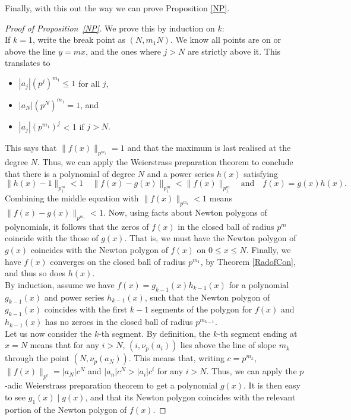 Finally, with this out the way we can prove Proposition \ref{NP}.

\begin{proof}[Proof of Proposition~\ref{NP}]
    We prove this by induction on $k$:\\
    If $k=1$, write the break point as $(N, m_1N)$. We know all points are on or above the line
    $y = m x$, and the ones where $j > N$ are strictly above it. This translates to
    \begin{itemize}
        \item $|a_j | (p^j)^{m_1} \leq 1$ for all $j$,
        \item $|a_N | (p^N)^{m_1} = 1$, and
        \item $|a_j | (p^{m_1})^j$ < 1 if $j > N.$
    \end{itemize}
    This says that $\|f(x) \|_{p^{m_1}} = 1$ and that the maximum is last realised at the degree
    $N$. Thus, we can apply the Weierstrass preparation theorem to conclude that there is a
    polynomial of degree $N$ and a power series $h(x)$ satisfying
    \[
    \| h(x) - 1 \|_{p^m_1} < 1 \quad \|f(x) - g(x)\|_{p^m_1} < \|f(x) \|_{p^m_1} \quad \text{and} \quad f(x) = g(x) h(x).
    \]
    Combining the middle equation with $\| f(x) \|_{p^{m_1}} < 1$ means
    $\| f(x) - g(x) \|_{p^{m_1}} < 1$.
    Now, using facts about Newton polygons of polynomials, it follows that the zeros of $f(x)$ in
    the closed ball of radius $p^m$ coincide with the those of $g(x)$. That is, we must have the
    Newton polygon of $g(x)$ coincides with the Newton polygon of $f(x)$ on $0 \leq x \leq N$.
    Finally, we have $f(x)$ converges on the closed ball of radius $p^{m_1}$, by Theorem
    \ref{RadofCon}, and thus so does $h(x).$
    \\
    By induction, assume we have $f(x) = g_{k-1}(x)h_{k-1}(x)$ for a polynomial $g_{k-1}(x)$ and
    power series $h_{k-1}(x)$, such that the Newton polygon of $g_{k-1}(x)$ coincides with the
    first $k-1$ segments of the polygon for $f(x)$ and $h_{k-1}(x)$ has no zeroes in the closed ball
    of radius $p^{m_{k-1}}$.
    \\
    Let us now consider the $k$-th segment. By definition, the $k$-th segment ending at $x = N$
    means that for any $i > N$, $(i, \nu_p (a_i))$ lies above the line of slope $m_k$ through the
    point $(N, \nu_p (a_N))$. This means that, writing $c = p^{m_k}$, $\| f(x) \|_{p^{c}} =
    \lvert a_N \rvert c^N$ and $\lvert a_n \rvert c^N > \lvert a_i \rvert c^i $ for any $i > N$.
    Thus, we can apply the $p$-adic Weierstrass preparation theorem to get a polynomial $g(x)$.
    It is then easy to see $g_1 (x) \mid g(x)$, and that its Newton polygon coincides with the
    relevant portion of the Newton polygon of $f(x).$
\end{proof}
